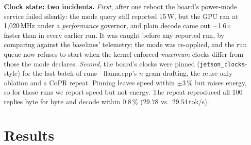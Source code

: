 \documentclass[conference]{IEEEtran}
\newcommand{\sys}{CoPR}
\newcommand{\lc}{llama.cpp}
\begin{document}
\textbf{Clock state: two incidents.} \emph{First}, after one reboot the
board's power-mode service failed silently: the mode query still reported
15\,W, but the GPU ran at 1{,}020\,MHz under a \emph{performance} governor, and
plain decode came out $\sim$1.6$\times$ faster than in every earlier run. It
was caught before any reported run, by comparing against the baselines'
telemetry; the mode was re-applied, and the run queue now refuses to start when
the kernel-enforced \emph{maximum} clocks differ from those the mode declares.
\emph{Second}, the board's clocks were pinned (\texttt{jetson\_clocks}-style)
for the last batch of runs---\lc{}'s $n$-gram drafting, the reuse-only ablation
and a \sys{} repeat. Pinning leaves speed within $\pm$3\,\% but raises energy,
so for those runs we report speed but not energy. The repeat
reproduced all 100 replies byte for byte and decode within 0.8\,\% (29.78 vs.\
29.54\,tok/s).

\section{Results}\label{sec:results}
\end{document}
